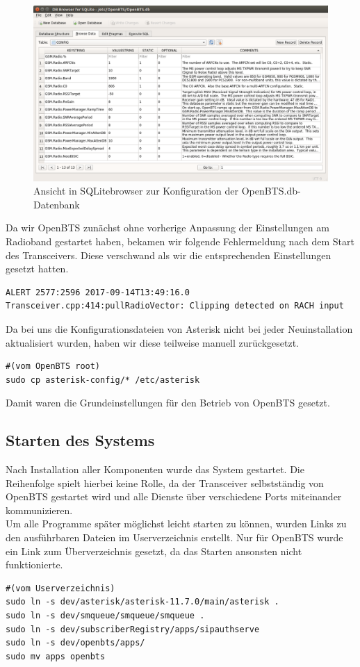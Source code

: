 \begin{figure}[htbp]
	\centering
		\includegraphics[width=1.0\textwidth]{includes/DB_OpenBts_GSMRadio}
	\caption{Ansicht in SQLitebrowser zur Konfiguration der OpenBTS.db-Datenbank}
	\label{fig:sqlitebrowser}
\end{figure}

Da wir OpenBTS zunächst ohne vorherige Anpassung der Einstellungen am Radioband gestartet haben, bekamen wir folgende Fehlermeldung nach dem Start des Transceivers. Diese verschwand als wir die entsprechenden Einstellungen gesetzt hatten.
\begin{lstlisting}
ALERT 2577:2596 2017-09-14T13:49:16.0 Transceiver.cpp:414:pullRadioVector: Clipping detected on RACH input
\end{lstlisting}

Da bei uns die Konfigurationsdateien von Asterisk nicht bei jeder Neuinstallation aktualisiert wurden, haben wir diese teilweise manuell zurückgesetzt.
\begin{lstlisting}
#(vom OpenBTS root)
sudo cp asterisk-config/* /etc/asterisk
\end{lstlisting}

Damit waren die Grundeinstellungen für den Betrieb von OpenBTS gesetzt.

\subsection{Starten des Systems}
Nach Installation aller Komponenten wurde das System gestartet. Die Reihenfolge spielt hierbei keine Rolle, da der Transceiver selbstständig von OpenBTS gestartet wird und alle Dienste über verschiedene Ports miteinander kommunizieren.\\
Um alle Programme später möglichst leicht starten zu können, wurden Links zu den ausführbaren Dateien im Userverzeichnis erstellt. Nur für OpenBTS wurde ein Link zum Überverzeichnis gesetzt, da das Starten ansonsten nicht funktionierte.
\begin{lstlisting}
#(vom Userverzeichnis)
sudo ln -s dev/asterisk/asterisk-11.7.0/main/asterisk .
sudo ln -s dev/smqueue/smqueue/smqueue .
sudo ln -s dev/subscriberRegistry/apps/sipauthserve
sudo ln -s dev/openbts/apps/
sudo mv apps openbts
\end{lstlisting}

